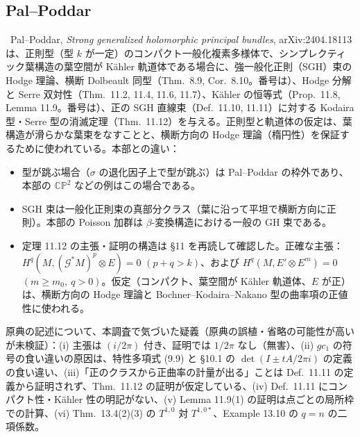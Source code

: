 \subsection{Pal--Poddar}
\tC\ Pal--Poddar, \emph{Strong generalized holomorphic principal bundles}, arXiv:2404.18113 は、正則型（型 $k$ が一定）のコンパクト一般化複素多様体で、シンプレクティック葉構造の葉空間が Kähler 軌道体である場合に、強一般化正則（SGH）束の Hodge 理論、横断 Dolbeault 同型（Thm.\ 8.9, Cor.\ 8.10。番号は\tQ）、Hodge 分解と Serre 双対性（Thm.\ 11.2, 11.4, 11.6, 11.7）、Kähler の恒等式（Prop.\ 11.8, Lemma 11.9。番号は\tQ）、正の SGH 直線束（Def.\ 11.10, 11.11）に対する Kodaira 型・Serre 型の消滅定理（Thm.\ 11.12）を与える。正則型と軌道体の仮定は、葉構造が滑らかな葉束をなすことと、横断方向の Hodge 理論（楕円性）を保証するために使われている。本部との違い：
\begin{itemize}
\item 型が跳ぶ場合（$\sigma$ の退化因子上で型が跳ぶ）は Pal--Poddar の枠外であり、本部の $\mathbb{CP}^2$ などの例はこの場合である。
\item SGH 束は一般化正則束の真部分クラス（葉に沿って平坦で横断方向に正則）。本部の Poisson 加群は $\beta$-変換構造における一般の GH 束である。
\item 定理 11.12 の主張・証明の構造は \S11 を再読して確認した。正確な主張：$H^q(M,(\mathcal G^*M)^p\otimes E)=0$ $(p+q>k)$、および $H^q(M,E'\otimes E^m)=0$ $(m\ge m_0,\ q>0)$。仮定（コンパクト、葉空間が Kähler 軌道体、$E$ が正）は、横断方向の Hodge 理論と Bochner--Kodaira--Nakano 型の曲率項の正値性に使われる。
\end{itemize}
原典の記述について、本調査で気づいた疑義（原典の誤植・省略の可能性が高いが未検証\tQ）：(i) 主張は $(i/2\pi)$ 付き、証明では $1/2\pi$ なし（無害）、(ii) $gc_1$ の符号の食い違いの原因は、特性多項式 (9.9) と \S10.1 の $\det(I\pm tA/2\pi i)$ の定義の食い違い、(iii)「正のクラスから正曲率の計量が出る」ことは Def.\ 11.11 の定義から証明されず、Thm.\ 11.12 の証明が仮定している、(iv) Def.\ 11.11 にコンパクト性・Kähler 性の明記がない、(v) Lemma 11.9(1) の証明は点ごとの局所枠での計算、(vi) Thm.\ 13.4(2)(3) の $T^{1,0}$ 対 $T^{1,0*}$、Example 13.10 の $q=n$ の二項係数。

